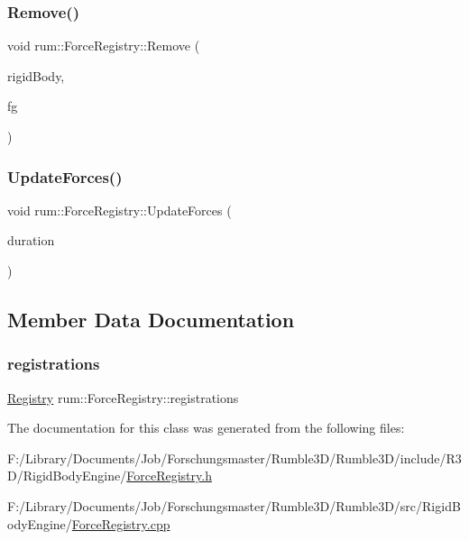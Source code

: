 \subsubsection{\texorpdfstring{Remove()}{Remove()}}
{\footnotesize\ttfamily void rum\+::\+Force\+Registry\+::\+Remove (\begin{DoxyParamCaption}\item[{\hyperlink{classrum_1_1_rigid_body}{Rigid\+Body} $\ast$}]{rigid\+Body,  }\item[{\hyperlink{classrum_1_1_force_generator}{Force\+Generator} $\ast$}]{fg }\end{DoxyParamCaption})}

\mbox{\label{classrum_1_1_force_registry_a162fdd23949e8c99523257a551c41e7c}} 
\subsubsection{\texorpdfstring{Update\+Forces()}{UpdateForces()}}
{\footnotesize\ttfamily void rum\+::\+Force\+Registry\+::\+Update\+Forces (\begin{DoxyParamCaption}\item[{\hyperlink{namespacerum_a7e8cca23573d5eaead0f138cbaa4862c}{real}}]{duration }\end{DoxyParamCaption})}



\subsection{Member Data Documentation}
\mbox{\label{classrum_1_1_force_registry_a6b37ba6705d19a996324d1d10d642041}} 
\subsubsection{\texorpdfstring{registrations}{registrations}}
{\footnotesize\ttfamily \hyperlink{classrum_1_1_force_registry_a9523605286e7ef4f693c3c485df757a6}{Registry} rum\+::\+Force\+Registry\+::registrations\hspace{0.3cm}{\ttfamily [protected]}}



The documentation for this class was generated from the following files\+:\begin{DoxyCompactItemize}
\item 
F\+:/\+Library/\+Documents/\+Job/\+Forschungsmaster/\+Rumble3\+D/\+Rumble3\+D/include/\+R3\+D/\+Rigid\+Body\+Engine/\hyperlink{_force_registry_8h}{Force\+Registry.\+h}\item 
F\+:/\+Library/\+Documents/\+Job/\+Forschungsmaster/\+Rumble3\+D/\+Rumble3\+D/src/\+Rigid\+Body\+Engine/\hyperlink{_force_registry_8cpp}{Force\+Registry.\+cpp}\end{DoxyCompactItemize}
